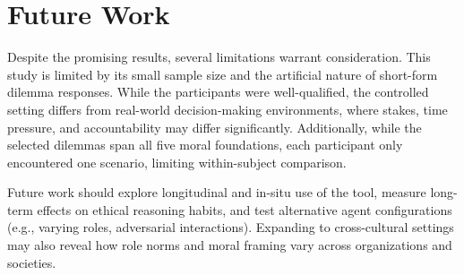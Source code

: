 \section{Future Work}

Despite the promising results, several limitations warrant consideration.
This study is limited by its small sample size and the artificial nature of short-form dilemma responses. While the participants were well-qualified, the controlled setting differs from real-world decision-making environments, where stakes, time pressure, and accountability may differ significantly. Additionally, while the selected dilemmas span all five moral foundations, each participant only encountered one scenario, limiting within-subject comparison.

Future work should explore longitudinal and in-situ use of the tool, measure long-term effects on ethical reasoning habits, and test alternative agent configurations (e.g., varying roles, adversarial interactions). Expanding to cross-cultural settings may also reveal how role norms and moral framing vary across organizations and societies.
